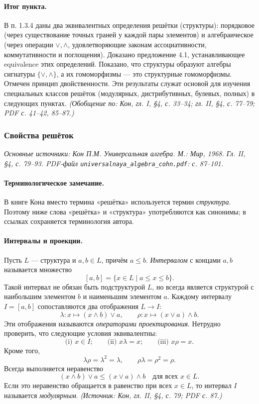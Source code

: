 \documentclass[a4paper,12pt]{article}
\begin{document}
\paragraph{Итог пункта.}
В п. 1.3.4 даны два эквивалентных определения решётки (структуры): порядковое (через существование точных граней у каждой пары элементов) и алгебраическое (через операции \(\vee,\wedge\), удовлетворяющие законам ассоциативности, коммутативности и поглощения). Доказано предложение 4.1, устанавливающее equivalence этих определений. Показано, что структуры образуют алгебры сигнатуры \(\{\vee,\wedge\}\), а их гомоморфизмы — это структурные гомоморфизмы. Отмечен принцип двойственности. Эти результаты служат основой для изучения специальных классов решёток (модулярных, дистрибутивных, булевых, полных) в следующих пунктах.
\textit{(Обобщение по: Кон, гл. I, §4, с. 33--34; гл. II, §4, с. 77--79; PDF с. 41--42, 85--87.)}

\subsubsection{Свойства решёток}

\noindent\textit{Основные источники: Кон П.М. Универсальная алгебра. М.: Мир, 1968. Гл. II, §4, с. 79--93. PDF-файл \texttt{universalnaya\_algebra\_cohn.pdf}: с. 87--101.}

\paragraph{Терминологическое замечание.}
В книге Кона вместо термина «решётка» используется термин \emph{структура}. Поэтому ниже слова «решётка» и «структура» употребляются как синонимы; в ссылках сохраняется терминология автора.

\paragraph{Интервалы и проекции.}
Пусть \(L\) — структура и \(a,b\in L\), причём \(a\le b\). \emph{Интервалом} с концами \(a,b\) называется множество
\[
[a,b]=\{x\in L\mid a\le x\le b\}.
\]
Такой интервал не обязан быть подструктурой \(L\), но всегда является структурой с наибольшим элементом \(b\) и наименьшим элементом \(a\). Каждому интервалу \(I=[a,b]\) сопоставляются два отображения \(L\to I\):
\[
\lambda\colon x\mapsto (x\wedge b)\vee a,
\qquad
\rho\colon x\mapsto (x\vee a)\wedge b.
\]
Эти отображения называются \emph{операторами проектирования}. Нетрудно проверить, что следующие условия эквивалентны:
\[
\text{(i) }x\in I;\qquad
\text{(ii) }x\lambda=x;\qquad
\text{(iii) }x\rho=x.
\]
Кроме того,
\[
\lambda\rho=\lambda^2=\lambda,
\qquad
\rho\lambda=\rho^2=\rho.
\]
Всегда выполняется неравенство
\[
(x\wedge b)\vee a\le (x\vee a)\wedge b
\quad\text{для всех }x\in L.
\]
Если это неравенство обращается в равенство при всех \(x\in L\), то интервал \(I\) называется \emph{модулярным}.
\textit{(Источник: Кон, гл. II, §4, с. 79; PDF с. 87.)}
\end{document}
